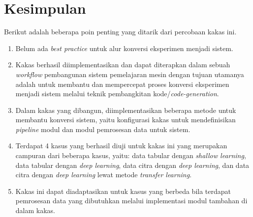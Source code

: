 \section{Kesimpulan}

Berikut adalah beberapa poin penting yang ditarik dari percobaan kakas ini.

\begin{enumerate}
    \item Belum ada \textit{best practice} untuk alur konversi eksperimen menjadi sistem.
    \item Kakas  berhasil diimplementasikan dan dapat diterapkan dalam sebuah \textit{workflow} pembangunan sistem pemelajaran mesin dengan tujuan utamanya adalah untuk membantu dan mempercepat proses konversi eksperimen menjadi sistem melalui teknik pembangkitan kode/\textit{code-generation}.
    \item Dalam kakas yang dibangun, diimplementasikan beberapa metode untuk membantu konversi sistem, yaitu konfigurasi kakas untuk mendefinisikan \textit{pipeline} modul dan modul pemrosesan data untuk sistem.
    \item Terdapat 4 kasus yang berhasil diuji untuk kakas ini yang merupakan campuran dari beberapa kasus, yaitu: data tabular dengan \textit{shallow learning}, data tabular dengan \textit{deep learning}, data citra dengan \textit{deep learning}, dan data citra dengan \textit{deep learning} lewat metode \textit{transfer learning}.
    \item Kakas ini dapat diadaptasikan untuk kasus yang berbeda bila terdapat pemrosesan data yang dibutuhkan melalui implementasi modul tambahan di dalam kakas.
\end{enumerate}
